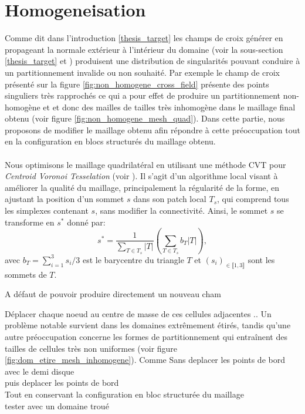 \section{Homogeneisation}

Comme dit dans l'introduction \ref{thesis_target} les champs de croix générer en propageant la normale extérieur à l'intérieur du domaine (voir la sous-section \ref{thesis_target} et \cite{kowalski2013pde}) produisent une distribution de singularités pouvant conduire à un partitionnement invalide ou non souhaité. Par exemple le champ de croix présenté sur la figure \ref{fig:non_homogene_cross_field} présente des points singuliers très rapprochés ce qui a pour effet de produire un partitionnement non-homogène et  et donc des mailles de tailles très inhomogène dans le maillage final obtenu (voir figure \ref{fig:non_homogene_mesh_quad}). Dans cette partie, nous proposons de modifier le maillage obtenu afin répondre à cette préoccupation tout en la configuration en blocs structurés du maillage obtenu.\\\\
Nous optimisons le maillage quadrilatéral en utilisant une méthode CVT pour \emph{Centroid Voronoi Tesselation} (voir \cite{chen2004mesh}). Il s'agit d'un algorithme local visant à améliorer la qualité du maillage, principalement la régularité de la forme, en ajustant la position d'un sommet $s$ dans son patch local $T_{s}$, qui comprend tous les simplexes contenant $s$, sans modifier la connectivité. Ainsi, le sommet $s$ se transforme en $s^*$ donné par:
$$s^*=\displaystyle\frac{1}{\displaystyle\sum_{T\in T_s}|T|}\left(\displaystyle\sum_{T\in T_s}b_T|T|\right),$$
avec $b_T=\sum_{i=1}^3s_i/3$ est le barycentre du triangle $T$ et $(s_i)_{\in\llbracket 1, 3\rrbracket}$ sont les sommets de $T$.

A défaut de pouvoir produire directement un nouveau cham

Déplacer chaque noeud au centre de masse de ces cellules adjacentes
.. Un problème notable survient dans les domaines extrêmement étirés, tandis qu'une autre préoccupation concerne les formes de partitionnement qui entraînent des tailles de cellules très non uniformes (voir figure \ref{fig:dom_etire_mesh_inhomogene}).
Comme
Sans deplacer les points de bord avec le demi disque\\
puis deplacer les points de bord\\
Tout en conservant la configuration en bloc structurée du maillage\\
tester avec un domaine troué

